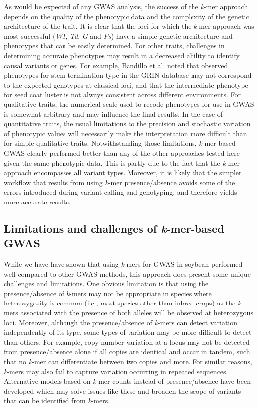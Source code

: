 \documentclass{article}
\begin{document}
As would be expected of any GWAS analysis, the success of the \emph{k}-mer approach
depends on the quality of the phenotypic data and the complexity of the genetic
architecture of the trait. It is clear that the loci for which the
\emph{k}-mer approach was most successful (\emph{W1}, \emph{Td}, \emph{G} and
\emph{Ps}) have a simple genetic architecture and phenotypes that can be easily
determined. For other traits, challenges in determining accurate phenotypes may
result in a decreased ability to identify causal variants or genes. For
example, Bandillo et al. \cite{bandillo2017} noted that observed phenotypes for stem
termination type in the GRIN database may not correspond to the expected
genotypes at classical loci, and that the intermediate phenotype for seed coat
luster is not always consistent across different environments. For qualitative
traits, the numerical scale used to recode phenotypes for use in GWAS is somewhat
arbitrary and may influence the final results. In the case of quantitative
traits, the usual limitations to the precision and stochastic variation of
phenotypic values will necessarily make the interpretation more difficult than
for simple qualitative traits. Notwithstanding those limitations,
\textit{k}-mer-based GWAS clearly performed better than any of the other
approaches tested here given the same phenotypic data. This is partly due
to the fact that the \textit{k}-mer approach encompasses all variant types.
Moreover, it is likely that the simpler workflow that results from using
\textit{k}-mer presence/absence avoids some of the errors introduced during
variant calling and genotyping, and therefore yields more accurate results.

\subsection*{Limitations and challenges of \emph{k}-mer-based GWAS}

While we have have shown that using \emph{k}-mers for GWAS in soybean performed
well compared to other GWAS methods, this approach does present some unique
challenges and limitations. One obvious limitation is that using the
presence/absence of \emph{k}-mers may not be appropriate in species where
heterozygosity is common (i.e., most species other than inbred crops) as the
\emph{k}-mers associated with the presence of both alleles will be observed at
heterozygous loci. Moreover, although the presence/absence of \emph{k}-mers can
detect variation independently of its type, some types of variation may be more
difficult to detect than others.  For example, copy number variation at a locus
may not be detected from presence/absence alone if all copies are identical and
occur in tandem, such that no \textit{k}-mer can differentiate between two
copies and more. For similar reasons, \emph{k}-mers may also fail to capture
variation occurring in repeated sequences. Alternative models based on
\emph{k}-mer counts instead of presence/absence have been developed
\citep{rahman2018, he2021} which may solve issues like these and broaden the
scope of variants that can be identified from \emph{k}-mers.
\end{document}
